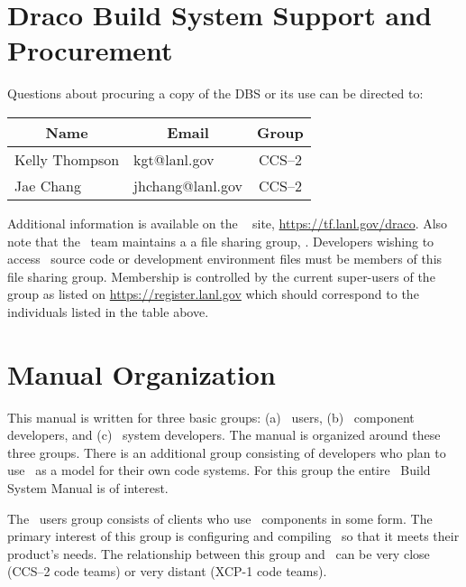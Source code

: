\section{Draco Build System Support and Procurement}
\label{sec:procurement}

Questions about procuring a copy of the DBS or its use can be
directed to:
\begin{center}
  \begin{tabular}{llc}\hline\hline
    \multicolumn{1}{c}{Name} & \multicolumn{1}{c}{Email} &
    Group \\ \hline
    Kelly Thompson & kgt@lanl.gov     & CCS--2 \\
    Jae Chang      & jhchang@lanl.gov & CCS--2 \\ \hline\hline
  \end{tabular}
\end{center}
Additional information is available on the \draco\ 
site, \href{https://tf.lanl.gov/draco}{https://tf.lanl.gov/draco}.  Also note that the \draco\ team 
maintains a a  file sharing group, .  
Developers wishing to access \draco\ source code or development environment files must be members of this file sharing group. 
Membership is controlled by the current super-users of the group as listed on \href{https://register.lanl.gov}{https://register.lanl.gov} 
which should correspond to the individuals listed in the table above.



\section{Manual Organization}

This manual is written for three basic groups: (a) \draco\ users, (b)
\draco\ component developers, and (c) \draco\ system developers. The
manual is organized around these three groups. There is an additional
group consisting of developers who plan to use \draco\ as a model for
their own code systems.  For this group the entire \draco\ Build
System Manual is of interest.

The \draco\ users group consists of clients who use \draco\ components
in some form.  The primary interest of this group is configuring  and
compiling  \draco\ so that it meets their product's needs.  The
relationship between this group and \draco\ can be very close (CCS--2
code teams) or very distant (XCP-1 code teams).

